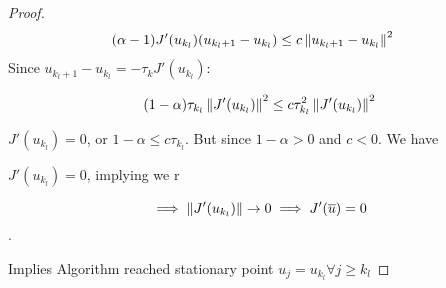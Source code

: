 \begin{theorem}
\begin{proof}
	\begin{align*}
	(\alpha -1) J'(u_{k_l})(u_{k_l+1}-u_{k_l}) &\leq c \left\lVert u_{k_l+1}-u_{k_l}\right\rVert^2 
	\end{align*}
	Since $u_{k_l+1}-u_{k_l}= -\tau_k J'(u_{k_l})$:
	
	\begin{align*}
		(1-\alpha) \tau_{k_l} \left\lVert J'(u_{k_l})\right\rVert^2 \leq c \tau_{k_l}^2\left\lVert J'(u_{k_l})\right\rVert^2
	\end{align*}
	
	$J'(u_{k_l})=0$, or $ 1-\alpha \leq c \tau_{k_l}$. But since $1-\alpha > 0$ and $c <0$. We have
	
	$J'(u_{k_l}) =0$, implying we r
	
	\[\implies \left\lVert J'(u_{k_l})\right\rVert \rightarrow 0 \implies J'(\overline{u})=0\].
	
	Implies Algorithm reached stationary point $u_j= u_{k_l} \forall j \geq k_l$
	\end{proof}
\end{theorem}
